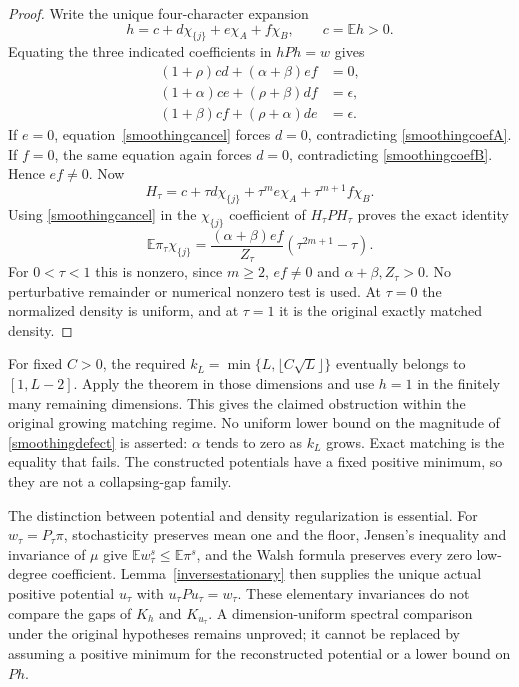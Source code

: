 \documentclass[11pt]{article}
\newcommand{\E}{\mathbb E}
\begin{document}
\begin{proof}
Write the unique four-character expansion
\[
 h=c+d\chi_{\{j\}}+e\chi_A+f\chi_B,\qquad c=\E h>0.
\]
Equating the three indicated coefficients in $hPh=w$ gives
\begin{align}
 (1+\rho)cd+(\alpha+\beta)ef&=0,\label{smoothingcancel}\\
 (1+\alpha)ce+(\rho+\beta)df&=\epsilon,\label{smoothingcoefA}\\
 (1+\beta)cf+(\rho+\alpha)de&=\epsilon.\label{smoothingcoefB}
\end{align}
If $e=0$, equation~\eqref{smoothingcancel} forces $d=0$, contradicting
\eqref{smoothingcoefA}. If $f=0$, the same equation again forces $d=0$,
contradicting \eqref{smoothingcoefB}. Hence $ef\ne0$.
Now
\[
 H_\tau=c+\tau d\chi_{\{j\}}+\tau^m e\chi_A
                         +\tau^{m+1}f\chi_B.
\]
Using \eqref{smoothingcancel} in the $\chi_{\{j\}}$ coefficient of
$H_\tau PH_\tau$ proves the exact identity
\begin{equation}\label{smoothingdefect}
 \E\pi_\tau\chi_{\{j\}}
   =\frac{(\alpha+\beta)ef}{Z_\tau}
                         (\tau^{2m+1}-\tau).
\end{equation}
For $0<\tau<1$ this is nonzero, since $m\geq2$, $ef\ne0$ and
$\alpha+\beta,Z_\tau>0$. No perturbative remainder or numerical
nonzero test is used. At $\tau=0$ the normalized density is uniform,
and at $\tau=1$ it is the original exactly matched density.
\end{proof}

For fixed $C>0$, the required $k_L=\min\{L,\lfloor C\sqrt L\rfloor\}$
eventually belongs to $[1,L-2]$. Apply the theorem in those dimensions
and use $h=1$ in the finitely many remaining dimensions. This gives the
claimed obstruction within the original growing matching regime.
No uniform lower bound on the magnitude of \eqref{smoothingdefect} is
asserted: $\alpha$ tends to zero as $k_L$ grows. Exact matching is the
equality that fails. The constructed potentials have a fixed positive
minimum, so they are not a collapsing-gap family.

The distinction between potential and density regularization is essential.
For $w_\tau=P_\tau\pi$, stochasticity preserves mean one and the floor,
Jensen's inequality and invariance of $\mu$ give
$\E w_\tau^s\leq\E\pi^s$, and the Walsh formula preserves every zero
low-degree coefficient. Lemma~\ref{inversestationary} then supplies the
unique actual positive potential $u_\tau$ with $u_\tau Pu_\tau=w_\tau$.
These elementary invariances do not compare the gaps of $K_h$ and
$K_{u_\tau}$. A dimension-uniform spectral comparison under the original
hypotheses remains unproved; it cannot be replaced by assuming a positive
minimum for the reconstructed potential or a lower bound on $Ph$.
\end{document}
